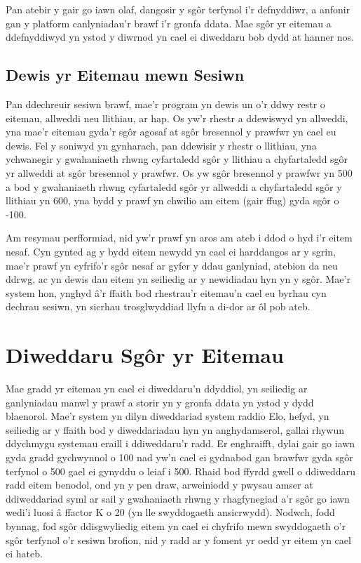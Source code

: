 Pan atebir y gair go iawn olaf, dangosir y sgôr terfynol i'r defnyddiwr, a anfonir gan y platform canlyniadau'r brawf i'r gronfa ddata. Mae sgôr yr eitemau a ddefnyddiwyd yn ystod y diwrnod yn cael ei diweddaru bob dydd at hanner nos.

\subsection{Dewis yr Eitemau mewn Sesiwn}
Pan ddechreuir sesiwn brawf, mae'r program yn dewis un o'r ddwy restr o eitemau, allweddi neu llithiau, ar hap. Os yw'r rhestr a ddewiswyd yn allweddi, yna mae'r eitemau gyda'r sgôr agosaf at sgôr bresennol y prawfwr yn cael eu dewis. Fel y soniwyd yn gynharach, pan ddewisir y rhestr o llithiau, yna ychwanegir y gwahaniaeth rhwng cyfartaledd sgôr y llithiau a chyfartaledd sgôr yr allweddi at sgôr bresennol y prawfwr. Os yw sgôr bresennol y prawfwr yn 500 a bod y gwahaniaeth rhwng cyfartaledd sgôr yr allweddi a chyfartaledd sgôr y llithiau yn 600, yna bydd y prawf yn chwilio am eitem (gair ffug) gyda sgôr o -100.

Am resymau perfformiad, nid yw'r prawf yn aros am ateb i ddod o hyd i'r eitem nesaf. Cyn gynted ag y bydd eitem newydd yn cael ei harddangos ar y sgrin, mae'r prawf yn cyfrifo'r sgôr nesaf ar gyfer y ddau ganlyniad, atebion da neu ddrwg, ac yn dewis dau eitem yn seiliedig ar y newidiadau hyn yn y sgôr. Mae'r system hon, ynghyd â'r ffaith bod rhestrau'r eitemau'n cael eu byrhau cyn dechrau sesiwn, yn sicrhau trosglwyddiad llyfn a di-dor ar ôl pob ateb.

\section{Diweddaru Sgôr yr Eitemau}
Mae gradd yr eitemau yn cael ei diweddaru'n ddyddiol, yn seiliedig ar ganlyniadau manwl y prawf a storir yn y gronfa ddata yn ystod y dydd blaenorol. Mae'r system yn dilyn diweddariad system raddio Elo, hefyd, yn seiliedig ar y ffaith bod y diweddariadau hyn yn anghydamserol, gallai rhywun ddychmygu systemau eraill i ddiweddaru'r radd. Er enghraifft, dylai gair go iawn gyda gradd gychwynnol o 100 nad yw'n cael ei gydnabod gan brawfwr gyda sgôr terfynol o 500 gael ei gynyddu o leiaf i 500. Rhaid bod ffyrdd gwell o ddiweddaru radd eitem benodol, ond yn y pen draw, arweiniodd y pwysau amser at ddiweddariad syml ar sail y gwahaniaeth rhwng y rhagfynegiad a'r sgôr go iawn wedi'i luosi â ffactor K o 20 (yn lle swyddogaeth ansicrwydd). Nodwch, fodd bynnag, fod sgôr ddisgwyliedig eitem yn cael ei chyfrifo mewn swyddogaeth o'r sgôr terfynol o'r sesiwn brofion, nid y radd ar y foment yr oedd yr eitem yn cael ei hateb.

